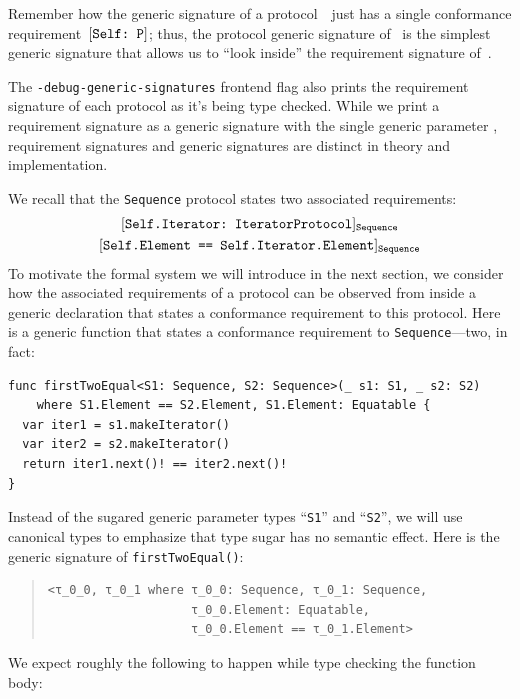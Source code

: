 \documentclass[../generics]{subfiles}
\begin{document}
Remember how the generic signature of a protocol~\tP\ just has a single conformance requirement~$[\texttt{Self:~P}]$; thus, the protocol generic signature of \tP~is the simplest generic signature that allows us to ``look inside'' the requirement signature of~\tP.

The \texttt{-debug-generic-signatures} frontend flag also prints the requirement signature of each protocol as it's being type checked. While we print a requirement signature as a generic signature with the single generic parameter \tSelf, requirement signatures and generic signatures are distinct in theory and implementation.

\begin{example}\label{motivating derived reqs}
We recall that the \texttt{Sequence} protocol states two associated requirements:
\begin{gather*}
\AssocConfReq{Self.Iterator}{IteratorProtocol}{Sequence}\\
\AssocSameReq{Self.Element}{Self.Iterator.Element}{Sequence}
\end{gather*}
To motivate the formal system we will introduce in the next section, we consider how the associated requirements of a protocol can be observed from inside a generic declaration that states a conformance requirement to this protocol. Here is a generic function that states a conformance requirement to \texttt{Sequence}---two, in fact:
\begin{Verbatim}
func firstTwoEqual<S1: Sequence, S2: Sequence>(_ s1: S1, _ s2: S2)
    where S1.Element == S2.Element, S1.Element: Equatable {
  var iter1 = s1.makeIterator()
  var iter2 = s2.makeIterator()
  return iter1.next()! == iter2.next()!
}
\end{Verbatim}
Instead of the sugared generic parameter types ``\texttt{S1}'' and ``\texttt{S2}'', we will use canonical types to emphasize that type sugar has no semantic effect. Here is the generic signature of \texttt{firstTwoEqual()}:
\begin{quote}
\begin{verbatim}
<τ_0_0, τ_0_1 where τ_0_0: Sequence, τ_0_1: Sequence,
                    τ_0_0.Element: Equatable,
                    τ_0_0.Element == τ_0_1.Element>
\end{verbatim}
\end{quote}
We expect roughly the following to happen while type checking the function body:

\end{example}
\end{document}
